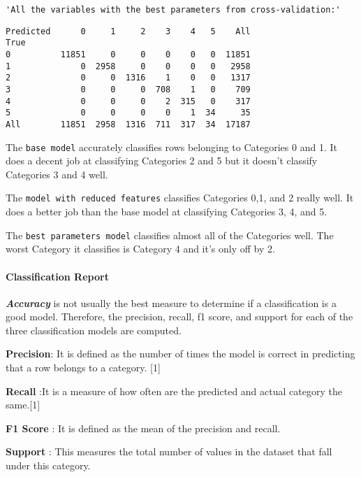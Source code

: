 \documentclass[11pt]{article}
\begin{document}
    
    
    \begin{verbatim}
'All the variables with the best parameters from cross-validation:'
    \end{verbatim}

    
    
    \begin{verbatim}
Predicted      0     1     2    3    4   5    All
True                                             
0          11851     0     0    0    0   0  11851
1              0  2958     0    0    0   0   2958
2              0     0  1316    1    0   0   1317
3              0     0     0  708    1   0    709
4              0     0     0    2  315   0    317
5              0     0     0    0    1  34     35
All        11851  2958  1316  711  317  34  17187
    \end{verbatim}

    
    The \texttt{base\ model} accurately classifies rows belonging to
Categories 0 and 1. It does a decent job at classifying Categories 2 and
5 but it doesn't classify Categories 3 and 4 well.

The \texttt{model\ with\ reduced\ features} classifies Categories 0,1,
and 2 really well. It does a better job than the base model at
classifying Categories 3, 4, and 5.

The \texttt{best\ parameters\ model} classifies almost all of the
Categories well. The worst Category it classifies is Category 4 and it's
only off by 2.

    \hypertarget{classification-report}{%
\paragraph{Classification Report}\label{classification-report}}

    \textbf{\emph{Accuracy}} is not usually the best measure to determine if
a classification is a good model. Therefore, the precision, recall, f1
score, and support for each of the three classification models are
computed.

 \textbf{Precision}: It is defined as the number of times the model is
correct in predicting that a row belongs to a category. {[}1{]}

 \textbf{Recall} :It is a measure of how often are the predicted and
actual category the same.{[}1{]}

 \textbf{F1 Score} : It is defined as the mean of the precision and
recall.

 \textbf{Support} : This measures the total number of values in the
dataset that fall under this category. 
\end{document}

